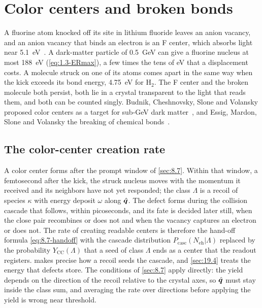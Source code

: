 \section{Color centers and broken bonds}\label{sec:16.6}

A fluorine atom knocked off its site in lithium fluoride leaves an anion vacancy, and an anion vacancy that binds an electron is an F center, which absorbs light near \SI{5.1}{eV}~\cite{guerreroperez2025first}. A dark-matter particle of \SI{0.5}{GeV} can give a fluorine nucleus at most \SI{188}{eV} (\cref{eq:1.3-ERmax}), a few times the tens of eV that a displacement costs. A molecule struck on one of its atoms comes apart in the same way when the kick exceeds its bond energy, \SI{4.75}{eV} for H$_2$. The F center and the broken molecule both persist, both lie in a crystal transparent to the light that reads them, and both can be counted singly. Budnik, Cheshnovsky, Slone and Volansky proposed color centers as a target for sub-GeV dark matter~\cite{budnik2018direct}, and Essig, Mardon, Slone and Volansky the breaking of chemical bonds~\cite{essig2017detection}.

\subsection{The color-center creation rate}\label{sec:16.6-cc}

A color center forms after the prompt window of \cref{sec:8.7}. Within that window, a femtosecond after the kick, the struck nucleus moves with the momentum it received and its neighbors have not yet responded; the class $\Lambda$ is a recoil of species $\kappa$ with energy deposit $\omega$ along $\hat{\bm{q}}$. The defect forms during the collision cascade that follows, within picoseconds, and its fate is decided later still, when the close pair recombines or does not and when the vacancy captures an electron or does not. The rate of creating readable centers is therefore the hand-off formula \cref{eq:8.7-handoff} with the cascade distribution $P_{\mathrm{casc}}(N_{\mathrm{eh}}|\Lambda)$ replaced by the probability $Y_{\mathrm{CC}}(\Lambda)$ that a seed of class $\Lambda$ ends as a center that the readout registers.  makes precise how a recoil seeds the cascade, and \cref{sec:19.4} treats the energy that defects store. The conditions of \cref{sec:8.7} apply directly: the yield depends on the direction of the recoil relative to the crystal axes, so $\hat{\bm{q}}$ must stay inside the class sum, and averaging the rate over directions before applying the yield is wrong near threshold.


